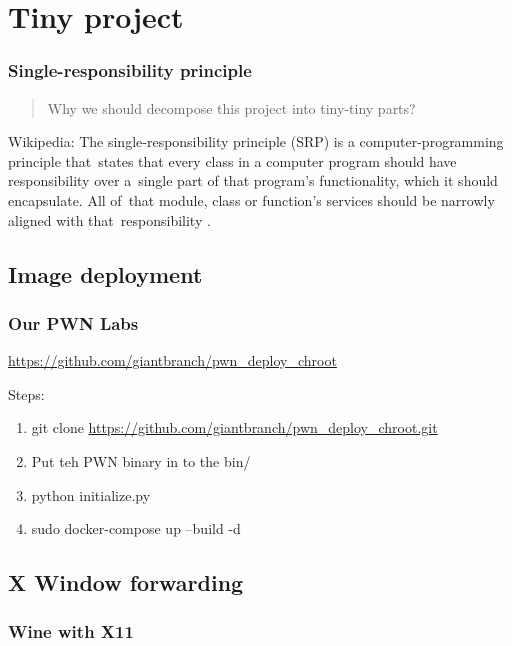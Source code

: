 \documentclass{beamer}
\begin{document}
\section{Tiny project}
\begin{frame}
    \frametitle{Single-responsibility principle}
    \begin{quote}
        Why we should decompose this project into tiny-tiny parts?
    \end{quote}

    \begin{block}{Wikipedia:}
        The single-responsibility principle (SRP) is a computer-programming principle that\
        states that every class in a computer program should have responsibility over a\
        single part of that program's functionality, which it should encapsulate. All of\
        that module, class or function's services should be narrowly aligned with that\
        responsibility \cite{SRP_wiki}.
    \end{block}
\end{frame}
\subsection{Image deployment}
\begin{frame}
    \frametitle{Our PWN Labs}
    \url{https://github.com/giantbranch/pwn_deploy_chroot}\\
    \begin{block}{Steps:}
        \begin{enumerate}
            \item git clone \url{https://github.com/giantbranch/pwn_deploy_chroot.git}
            \item Put teh PWN binary in to the bin/
            \item python initialize.py
            \item sudo docker-compose up --build -d
        \end{enumerate}
    \end{block}

\end{frame}

\subsection{X Window forwarding}
\begin{frame}
    \frametitle{Wine with X11}
\end{frame}
\end{document}
